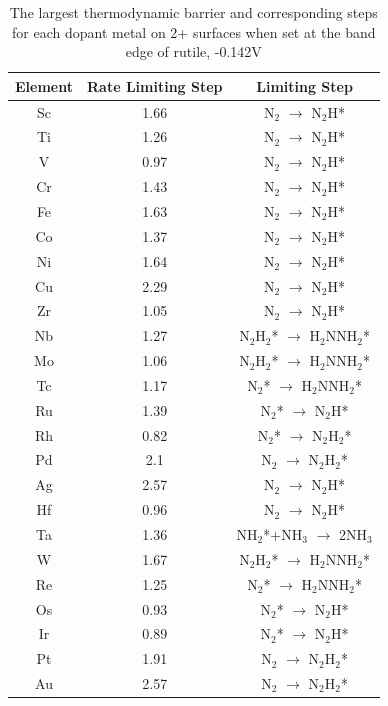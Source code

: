 \documentclass{article}
\begin{document}
\begin{table}
\begin{center}
\begin{tabular}{| c | c |c |}
\hline
Element & Rate Limiting Step & Limiting Step \\
\hline
Sc & 1.66 & N$_2$ $\rightarrow$ N$_2$H*\\
Ti & 1.26 & N$_2$ $\rightarrow$ N$_2$H*\\
V & 0.97 & N$_2$ $\rightarrow$ N$_2$H*\\
Cr & 1.43 & N$_2$ $\rightarrow$ N$_2$H*\\
Fe & 1.63 & N$_2$ $\rightarrow$ N$_2$H*\\
Co & 1.37 & N$_2$ $\rightarrow$ N$_2$H*\\
Ni & 1.64 & N$_2$ $\rightarrow$ N$_2$H*\\
Cu & 2.29 & N$_2$ $\rightarrow$ N$_2$H*\\
Zr & 1.05 & N$_2$ $\rightarrow$ N$_2$H*\\
Nb & 1.27 & N$_2$H$_2$* $\rightarrow$ H$_2$NNH$_2$*\\
Mo & 1.06 & N$_2$H$_2$* $\rightarrow$ H$_2$NNH$_2$*\\
Tc & 1.17 & N$_2$* $\rightarrow$ H$_2$NNH$_2$*\\
Ru & 1.39 & N$_2$* $\rightarrow$ N$_2$H*\\
Rh & 0.82 & N$_2$* $\rightarrow$ N$_2$H$_2$*\\
Pd & 2.1 & N$_2$ $\rightarrow$ N$_2$H$_2$*\\
Ag & 2.57 & N$_2$ $\rightarrow$ N$_2$H*\\
Hf & 0.96 & N$_2$ $\rightarrow$ N$_2$H*\\
Ta & 1.36 & NH$_2$*+NH$_3$ $\rightarrow$ 2NH$_3$\\
W & 1.67 & N$_2$H$_2$* $\rightarrow$ H$_2$NNH$_2$*\\
Re & 1.25 & N$_2$* $\rightarrow$ H$_2$NNH$_2$*\\
Os & 0.93 & N$_2$* $\rightarrow$ N$_2$H*\\
Ir & 0.89 & N$_2$* $\rightarrow$ N$_2$H*\\
Pt & 1.91 & N$_2$ $\rightarrow$ N$_2$H$_2$*\\
Au & 2.57 & N$_2$ $\rightarrow$ N$_2$H$_2$*\\
\hline
\end{tabular}
\end{center}
\caption{The largest thermodynamic barrier and corresponding steps for each dopant metal on 2+ surfaces when set at the band edge of rutile, -0.142V}\label{table:rate_limiting_steps}\end{table}\begin{figure}

\end{figure}
\end{document}
